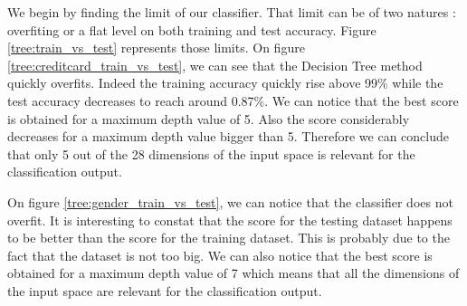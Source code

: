 \documentclass[10pt]{article}
\begin{document}
			We begin by finding the limit of our classifier. That limit can be of two natures : overfiting or a flat level on both training and test accuracy. Figure \ref{tree:train_vs_test} represents those limits. On figure \ref{tree:creditcard_train_vs_test}, we can see that the Decision Tree method quickly overfits. Indeed the training accuracy quickly rise above 99\% while the test accuracy decreases to reach around 0.87\%. We can notice that the best score is obtained for a maximum depth value of 5. Also the score considerably decreases for a maximum depth value bigger than 5. Therefore we can conclude that only 5 out of the 28 dimensions of the input space is relevant for the classification output.

			On figure \ref{tree:gender_train_vs_test}, we can notice that the classifier does not overfit. It is interesting to constat that the score for the testing dataset happens to be better than the score for the training dataset. This is probably due to the fact that the dataset is not too big. We can also notice that the best score is obtained for a maximum depth value of 7 which means that all the dimensions of the input space are relevant for the classification output.
\end{document}

